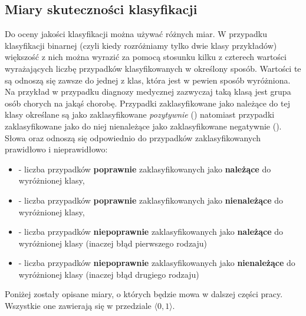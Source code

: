 \subsection{Miary skuteczności klasyfikacji}\label{sec:measures}
	Do oceny jakości klasyfikacji można używać różnych miar. W przypadku klasyfikacji binarnej (czyli kiedy rozróżniamy tylko dwie klasy przykładów) większość z nich można wyrazić za pomocą stosunku kilku z czterech wartości wyrażających liczbę przypadków klasyfikowanych w określony sposób. Wartości te są odnoszą się zawsze do jednej z klas, która jest w pewien sposób wyróżniona. Na przykład w przypadku diagnozy medycznej zazwyczaj taką klasą jest grupa osób chorych na jakąś chorobę. Przypadki zaklasyfikowane jako należące do tej klasy określane są jako zaklasyfikowane \textit{pozytywnie} () natomiast przypadki zaklasyfikowane jako do niej nienależące jako zaklasyfikowane negatywnie (). Słowa  oraz  odnoszą się odpowiednio do przypadków zaklasyfikowanych prawidłowo i nieprawidłowo:
	\begin{itemize}
		\item {} - liczba przypadków \textbf{poprawnie} zaklasyfikowanych jako \textbf{należące} do wyróżnionej klasy,
		\item  {} - liczba przypadków \textbf{poprawnie} zaklasyfikowanych jako \textbf{nienależące} do wyróżnionej klasy,
		\item {} - liczba przypadków \textbf{niepoprawnie} zaklasyfikowanych jako \textbf{należące} do wyróżnionej klasy (inaczej błąd pierwszego rodzaju)
		\item {} - liczba przypadków \textbf{niepoprawnie} zaklasyfikowanych jako \textbf{nienależące} do wyróżnionej klasy (inaczej błąd drugiego rodzaju)
	\end{itemize}		
	
	 Poniżej zostały opisane miary, o których będzie mowa w dalszej części pracy. Wszystkie one zawierają się w przedziale $ \langle 0,1 \rangle $.

